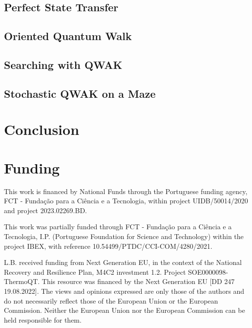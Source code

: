 \documentclass[preprint,12pt]{elsarticle}
\begin{document}
    \subsection{Perfect State Transfer}
        
    \subsection{Oriented Quantum Walk}
        
    \subsection{Searching with QWAK}
        
    \subsection{Stochastic QWAK on a Maze}
        


\section{Conclusion}\label{sec:conclusion}
    

\clearpage

\section*{Funding}
This work is financed by National Funds through the Portuguese funding agency,
FCT - Fundação para a Ciência e a Tecnologia, within project UIDB/50014/2020 and project 2023.02269.BD. 

This work was partially funded  through FCT - Fundação para a Ciência e a Tecnologia, I.P. (Portuguese Foundation for Science and Technology) within the project IBEX, with reference 10.54499/PTDC/CCI-COM/4280/2021.

\sloppy
L.B. received funding from Next Generation EU, in the context of the National
Recovery and Resilience Plan, M4C2 investment 1.2. Project SOE0000098-ThermoQT. This resource was financed by the Next Generation EU [DD 247 19.08.2022]. The
views and opinions expressed are only those of the authors and do not
necessarily reflect those of the European Union or the European Commission.
Neither the European Union nor the European Commission can be held responsible
for them.

\end{document}
